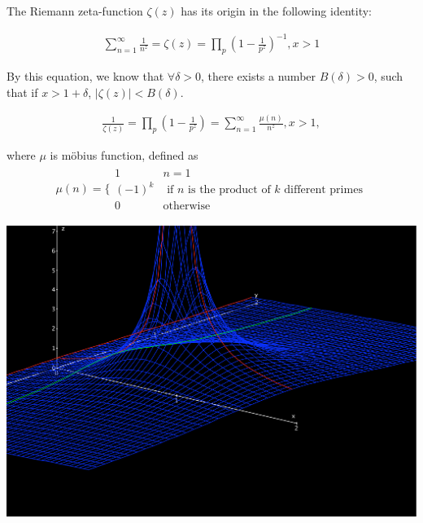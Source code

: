 \documentclass{beamer}
\begin{document}
\frame
{
The Riemann zeta-function $\zeta(z)$ has its origin in the following identity:

\begin{align*}
\sum^{\infty}_{n=1} \frac{1}{n^z} = \zeta(z) = \prod_{p} (1 - \frac{1}{p^z})^{-1}, x > 1
\end{align*}

By this equation, we know that $\forall \delta > 0$, there exists a number $B(\delta) > 0$, such
that if $x > 1 + \delta$, $|\zeta(z)| < B(\delta)$.

}

\frame
{
\begin{align*}
\frac{1}{\zeta(z)} = \prod_{p} (1 - \frac{1}{p^z})  
                                  = \sum^{\infty}_{n=1} \frac{\mu(n)}{n^z},  x > 1,
\end{align*}

where $\mu$ is m\"obius function, defined as
\begin{align*}
\mu(n) = \Bigg \{\begin{array}{ cc}
      1&           n =1 \\
       (-1)^k &  \mbox{ if $n$ is the product of $k$ different primes} \\
       0 & \mbox{otherwise}
      \end{array}
\end{align*}
}

\frame
{
\begin{center}
\includegraphics[scale=0.3]{pics/Riemann1.pdf}
\end{center}
}
\end{document}
